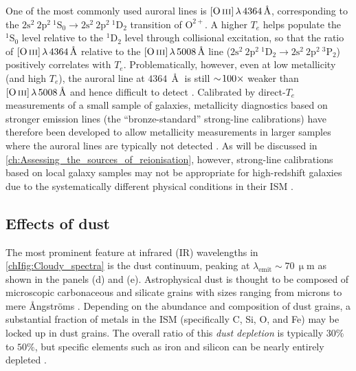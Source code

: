 One of the most commonly used auroral lines is $\OIIIf \, \lambda \, 4364 \, \Angstrom$, corresponding to the $\mathrm{2s^2 \: 2p^{2} \: ^1S_0} \rightarrow \mathrm{2s^2 \: 2p^{2} \: ^1D_2}$ transition of $\mathrm{O^{2+}}$. A higher $T_e$ helps populate the $\mathrm{^1S_0}$ level relative to the $\mathrm{^1D_2}$ level through collisional excitation, so that the ratio of $\OIIIf \, \lambda \, 4364 \, \Angstrom$ relative to the $\OIIIf \, \lambda \, 5008 \, \Angstrom$ line ($\mathrm{2s^2 \: 2p^{2} \: ^1D_2} \rightarrow \mathrm{2s^2 \: 2p^{2} \: ^3P_2}$) positively correlates with $T_e$. Problematically, however, even at low metallicity (and high $T_e$), the auroral line at $4364 \, \Angstrom$ is still $\sim \! 100 \times$ weaker than $\OIIIf \, \lambda \, 5008 \, \Angstrom$ and hence difficult to detect . Calibrated by direct-$T_e$ measurements of a small sample of galaxies, metallicity diagnostics based on stronger emission lines (the ``bronze-standard'' strong-line calibrations) have therefore been developed to allow metallicity measurements in larger samples where the auroral lines are typically not detected \citep[e.g.][]{2004MNRAS.348L..59P, 2008A&A...488..463M, 2017MNRAS.465.1384C}. As will be discussed in \cref{ch:Assessing_the_sources_of_reionisation}, however, strong-line calibrations based on local galaxy samples may not be appropriate for high-redshift galaxies due to the systematically different physical conditions in their ISM \citep[e.g.][]{2018ApJ...859..175B, 2022arXiv220712375C}.

\subsection{Effects of dust}
\label{chIssec:Effects_of_dust}

The most prominent feature at infrared (IR) wavelengths in \cref{chIfig:Cloudy_spectra} is the dust continuum, peaking at $\lambda_\text{emit} \sim 70 \, \mathrm{\upmu m}$ as shown in the panels (d) and (e). Astrophysical dust is thought to be composed of microscopic carbonaceous and silicate grains with sizes ranging from microns to mere {\AA}ngstr{\"o}ms \citep[down to the point where the ``grain'' is a single molecule;][]{2003ARA&A..41..241D}. Depending on the abundance and composition of dust grains, a substantial fraction of metals in the ISM (specifically C, Si, O, and Fe) may be locked up in dust grains. The overall ratio of this \textit{dust depletion} is typically $30\%$ to $50\%$, but specific elements such as iron and silicon can be nearly entirely depleted .

